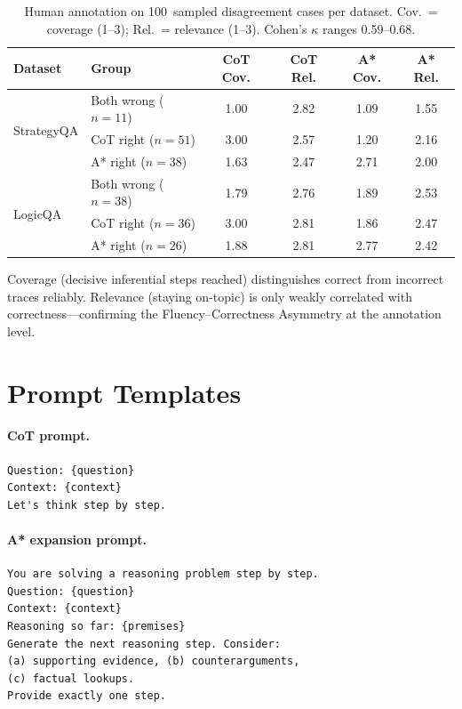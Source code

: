 \documentclass[11pt]{article}
\begin{document}
\begin{table}[h]
\centering
\caption{Human annotation on 100~sampled disagreement cases per dataset. Cov.\ = coverage (1--3); Rel.\ = relevance (1--3). Cohen's $\kappa$ ranges 0.59--0.68.}
\label{tab:human}
\small
\begin{tabular}{@{}llcccc@{}}
\toprule
\textbf{Dataset} & \textbf{Group} & \textbf{CoT Cov.} & \textbf{CoT Rel.} & \textbf{A* Cov.} & \textbf{A* Rel.} \\
\midrule
\multirow{3}{*}{StrategyQA}
& Both wrong ($n{=}11$) & 1.00 & 2.82 & 1.09 & 1.55 \\
& CoT right ($n{=}51$) & 3.00 & 2.57 & 1.20 & 2.16 \\
& A* right ($n{=}38$) & 1.63 & 2.47 & 2.71 & 2.00 \\
\midrule
\multirow{3}{*}{LogicQA}
& Both wrong ($n{=}38$) & 1.79 & 2.76 & 1.89 & 2.53 \\
& CoT right ($n{=}36$) & 3.00 & 2.81 & 1.86 & 2.47 \\
& A* right ($n{=}26$) & 1.88 & 2.81 & 2.77 & 2.42 \\
\bottomrule
\end{tabular}
\end{table}

Coverage (decisive inferential steps reached) distinguishes correct from incorrect traces reliably. Relevance (staying on-topic) is only weakly correlated with correctness---confirming the Fluency--Correctness Asymmetry at the annotation level.

\section{Prompt Templates}
\label{app:prompts}

\paragraph{CoT prompt.}
\begin{verbatim}
Question: {question}
Context: {context}
Let's think step by step.
\end{verbatim}

\paragraph{A* expansion prompt.}
\begin{verbatim}
You are solving a reasoning problem step by step.
Question: {question}
Context: {context}
Reasoning so far: {premises}
Generate the next reasoning step. Consider:
(a) supporting evidence, (b) counterarguments,
(c) factual lookups.
Provide exactly one step.
\end{verbatim}
\end{document}
